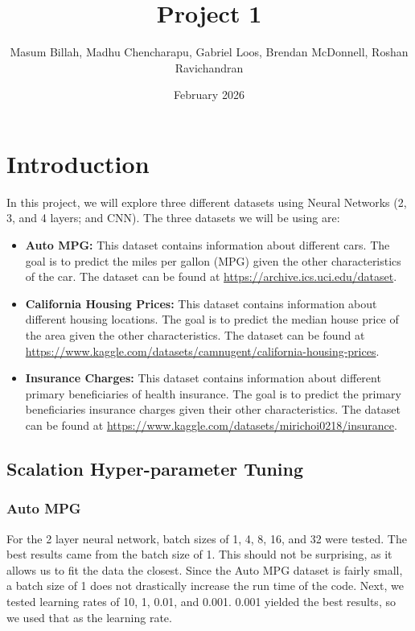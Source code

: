 \documentclass{article}
\title{Project 1}
\author{Masum Billah, Madhu Chencharapu, Gabriel Loos, Brendan McDonnell, Roshan Ravichandran}
\date{February 2026}
\begin{document}
\maketitle

\section{Introduction}

In this project, we will explore three different datasets using Neural Networks (2, 3, and 4 layers; and CNN). The three datasets we will be using are:

\begin{itemize}
	\item \textbf{Auto MPG:} This dataset contains information about different cars. The goal is to predict the miles per gallon (MPG) given the other characteristics of the car. The dataset can be found at \url{https://archive.ics.uci.edu/dataset}.
	\item \textbf{California Housing Prices:} This dataset contains information about different housing locations. The goal is to predict the median house price of the area given the other characteristics. The dataset can be found at \url{https://www.kaggle.com/datasets/camnugent/california-housing-prices}.
	\item \textbf{Insurance Charges:} This dataset contains information about different primary beneficiaries of health insurance. The goal is to predict the primary beneficiaries insurance charges given their other characteristics. The dataset can be found at \url{https://www.kaggle.com/datasets/mirichoi0218/insurance}.
\end{itemize}

\subsection{Scalation Hyper-parameter Tuning}

\subsubsection{Auto MPG}

For the 2 layer neural network, batch sizes of 1, 4, 8, 16, and 32 were tested. The best results came from the batch size of 1. This should not be surprising, as it allows us to fit the data the closest. Since the Auto MPG dataset is fairly small, a batch size of 1 does not drastically increase the run time of the code. Next, we tested learning rates of 10, 1, 0.01, and 0.001. 0.001 yielded the best results, so we used that as the learning rate.
\end{document}
